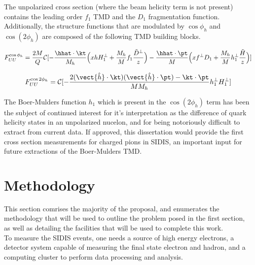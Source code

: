 The unpolarized cross section (where the beam helicity term is not present) contains the leading order $f_1$ TMD and the $D_1$ fragmentation function.  Additionally, the structure functions that are modulated by $\cos\phi_h$ and $\cos(2\phi_h)$ are composed of the following TMD building blocks.

\begin{equation}
F_{UU}^{\cos \phi_h} = \frac{2M}{Q} \mathcal{C}[ - \frac{\hhat \cdot \kt}{M_h} \Bigl( x h H_{1}^{\perp} + \frac{M_h}{M} f_1 \frac{\tilde{D}^{\perp}}{z} \Bigr) - \frac{\hhat \cdot \pt}{M} \Bigl( x f^{\perp} D_1 + \frac{M_h}{M} h_1^{\perp} \frac{\tilde{H}}{z} \Bigr)]
\end{equation}

\begin{equation}
F_{UU}^{\cos 2\phi_h} = \mathcal{C}[- \frac{2 (\vect{\hat{h}} \cdot \kt) (\vect{\hat{h}} \cdot \pt) - \kt \cdot \pt}{M M_h} h_{1}^{\perp} H_{1}^{\perp} ]
\end{equation}

The Boer-Mulders function $h_1$ which is present in the $\cos(2\phi_h)$ term has been the subject of continued interest for it's interpretation as the difference of quark helicity states in an unpolarized nucelon, and for being notoriously difficult to extract from current data.  If approved, this dissertation would provide the first cross section measurements for charged pions in SIDIS, an important input for future extractions of the Boer-Mulders TMD.  

%
%

\section{Methodology}
This section comrises the majority of the proposal, and enumerates the methodology that will be used to outline the problem posed in the first section, as well as detailing the facilities that will be used to complete this work.  \\

To measure the SIDIS events, one needs a source of high energy electrons, a detector system capable of measuring the final state electron and hadron, and a computing cluster to perform data processing and analysis.

